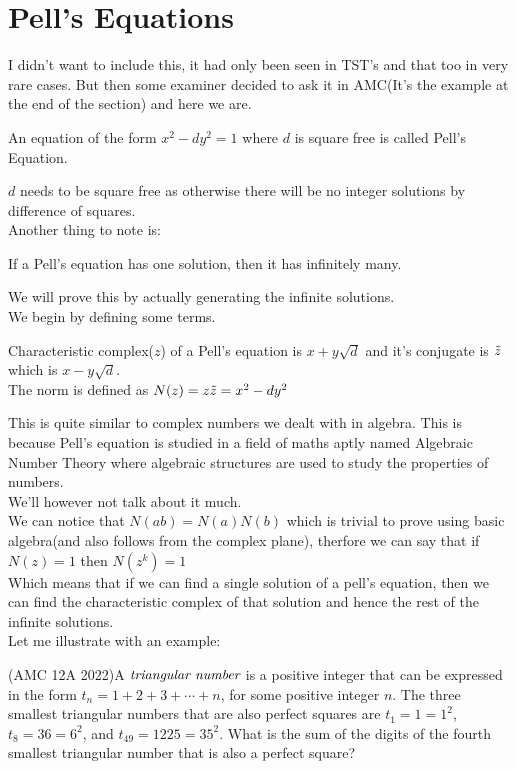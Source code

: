 \section{Pell's Equations}
I didn't want to include this, it had only been seen in TST's and that too in very rare cases. But then some examiner decided to ask it in AMC(It's the example at the end of the section) and here we are.\\
\begin{definition}
    An equation of the form $x^2-dy^2=1$ where $d$ is square free is called Pell's Equation.
\end{definition}
$d$ needs to be square free as otherwise there will be no integer solutions by difference of squares.\\
Another thing to note is:\\
\begin{theorem}
    If a Pell’s equation has one solution, then it has infinitely many.
\end{theorem}
We will prove this by actually generating the infinite solutions.\\
We begin by defining some terms.\\
\begin{definition}
    Characteristic complex($z$) of a Pell's equation is $x+y\sqrt{d}$ and it's conjugate is $\Tilde{z}$ which is $x-y\sqrt{d}$.\\
    The norm is defined as $N(z)=z\Tilde{z}=x^2-dy^2$\\
\end{definition}
This is quite similar to complex numbers we dealt with in algebra. This is because Pell's equation is studied in a field of maths aptly named Algebraic Number Theory where algebraic structures are used to study the properties of numbers.\\
We'll however not talk about it much.\\
We can notice that $N(ab)=N(a)N(b)$ which is trivial to prove using basic algebra(and also follows from the complex plane), therfore we can say that if $N(z)=1$ then $N(z^k)=1$\\
Which means that if we can find a single solution of a pell's equation, then we can find the characteristic complex of that solution and hence the rest of the infinite solutions.\\
Let me illustrate with an example:\\
\begin{example}
    (AMC 12A 2022)A $\emph{triangular number}$ is a positive integer that can be expressed in the form $t_n = 1+2+3+\cdots+n$, for some positive integer $n$. The three smallest triangular numbers that are also perfect squares are $t_1 = 1 = 1^2$, $t_8 = 36 = 6^2$, and $t_{49} = 1225 = 35^2$. What is the sum of the digits of the fourth smallest triangular number that is also a perfect square?
\end{example}
